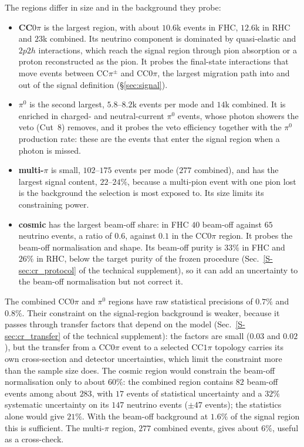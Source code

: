 \documentclass[11pt,a4paper]{article}
\newcommand{\suppref}[2]{#1~\ref{S-#2} of the technical supplement}
\begin{document}
The regions differ in size and in the background they probe:
\begin{itemize}
  \item \textbf{CC$0\pi$} is the largest region, with about $10.6$k events in FHC, $12.6$k in RHC and
    $23$k combined. Its neutrino component is dominated by quasi-elastic and $2p2h$ interactions,
    which reach the signal region through pion absorption or a proton reconstructed as the pion. It
    probes the final-state interactions that move events between CC$\pi^{\pm}$ and CC$0\pi$, the
    largest migration path into and out of the signal definition (\S\ref{sec:signal}).
  \item \textbf{$\pi^0$} is the second largest, $5.8$--$8.2$k events per mode and $14$k combined. It is
    enriched in charged- and neutral-current $\pi^0$ events, whose photon showers the veto (Cut~8)
    removes, and it probes the veto efficiency together with the $\pi^0$ production rate: these are
    the events that enter the signal region when a photon is missed.
  \item \textbf{multi-$\pi$} is small, $102$--$175$ events per mode ($277$ combined), and has the
    largest signal content, $22$--$24\%$, because a multi-pion event with one pion lost is the
    background the selection is most exposed to. Its size limits its constraining power.
  \item \textbf{cosmic} has the largest beam-off share: in FHC $40$ beam-off against $65$ neutrino
    events, a ratio of $0.6$, against $0.1$ in the CC$0\pi$ region. It probes the beam-off
    normalisation and shape. Its beam-off purity is $33\%$ in FHC and $26\%$ in RHC, below the
    target purity of the frozen procedure (\suppref{Sec.}{sec:cr_protocol}), so it can add an
    uncertainty to the beam-off normalisation but not correct it.
\end{itemize}

The combined CC$0\pi$ and $\pi^0$ regions have raw statistical precisions of $0.7\%$ and $0.8\%$.
Their constraint on the signal-region background is weaker, because it passes through transfer
factors that depend on the model (\suppref{Sec.}{sec:cr_transfer}): the factors are small ($0.03$
and $0.02$), but the transfer from a CC$0\pi$ event to a selected CC$1\pi$ topology carries its own
cross-section and detector uncertainties, which limit the constraint more than the sample size
does. The cosmic region would constrain the beam-off normalisation only to about $60\%$: the
combined region contains $82$ beam-off events among about $283$, with $17$ events of statistical
uncertainty and a $32\%$ systematic uncertainty on its $147$ neutrino events ($\pm47$ events); the
statistics alone would give $21\%$. With the beam-off background at $1.6\%$ of the signal region this
is sufficient. The multi-$\pi$ region, $277$ combined events, gives about $6\%$, useful as a
cross-check.
\end{document}
